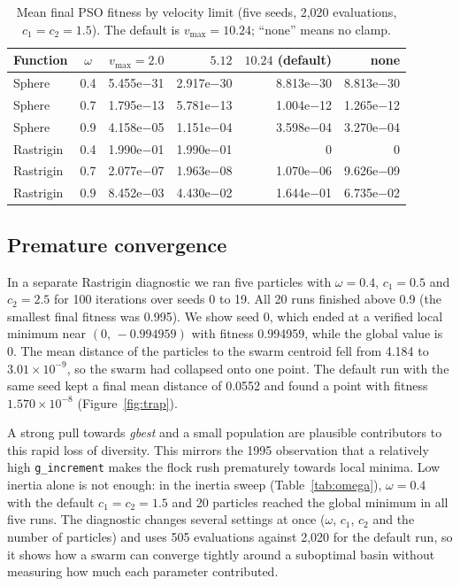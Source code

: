 \documentclass[11pt,a4paper]{article}
\newcommand{\vmax}{v_{\max}}
\newcommand{\tn}[1]{\textit{#1}}
\begin{document}
\begin{table}[ht]
\centering
\caption{Mean final PSO fitness by velocity limit (five seeds, 2,020 evaluations, $c_1=c_2=1.5$). The default is $\vmax=10.24$; ``none'' means no clamp.}\label{tab:vmax}
\small
\begin{tabular}{@{}lcrrrr@{}}
\toprule
\textbf{Function} & $\omega$ & $\vmax=2.0$ & $5.12$ & $10.24$ (default) & none\\
\midrule
Sphere & 0.4 & 5.455e$-$31 & 2.917e$-$30 & 8.813e$-$30 & 8.813e$-$30\\
Sphere & 0.7 & 1.795e$-$13 & 5.781e$-$13 & 1.004e$-$12 & 1.265e$-$12\\
Sphere & 0.9 & 4.158e$-$05 & 1.151e$-$04 & 3.598e$-$04 & 3.270e$-$04\\
Rastrigin & 0.4 & 1.990e$-$01 & 1.990e$-$01 & 0 & 0\\
Rastrigin & 0.7 & 2.077e$-$07 & 1.963e$-$08 & 1.070e$-$06 & 9.626e$-$09\\
Rastrigin & 0.9 & 8.452e$-$03 & 4.430e$-$02 & 1.644e$-$01 & 6.735e$-$02\\
\bottomrule
\end{tabular}
\end{table}

\subsection{Premature convergence}
In a separate Rastrigin diagnostic we ran five particles with $\omega=0.4$, $c_1=0.5$ and $c_2=2.5$ for 100 iterations over seeds 0 to 19. All 20 runs finished above 0.9 (the smallest final fitness was 0.995). We show seed 0, which ended at a verified local minimum near $(0,\,-0.994959)$ with fitness 0.994959, while the global value is 0. The mean distance of the particles to the swarm centroid fell from 4.184 to $3.01\times10^{-9}$, so the swarm had collapsed onto one point. The default run with the same seed kept a final mean distance of 0.0552 and found a point with fitness $1.570\times10^{-8}$ (Figure~\ref{fig:trap}).

A strong pull towards \tn{gbest} and a small population are plausible contributors to this rapid loss of diversity. This mirrors the 1995 observation that a relatively high \texttt{g\_increment} makes the flock rush prematurely towards local minima. Low inertia alone is not enough: in the inertia sweep (Table~\ref{tab:omega}), $\omega=0.4$ with the default $c_1=c_2=1.5$ and 20 particles reached the global minimum in all five runs. The diagnostic changes several settings at once ($\omega$, $c_1$, $c_2$ and the number of particles) and uses 505 evaluations against 2,020 for the default run, so it shows how a swarm can converge tightly around a suboptimal basin without measuring how much each parameter contributed.
\end{document}
